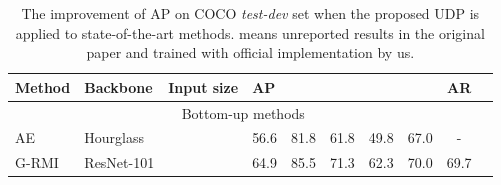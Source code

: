 \documentclass[10pt,journal,compsoc]{IEEEtran}
\begin{document}
\begin{table*}
\caption{The improvement of AP on COCO \textit{test-dev} set when the proposed UDP is applied to state-of-the-art methods.  means unreported results in the original paper and trained with official implementation by us.}
\label{tab:test-dev}
\begin{center}
\begin{tabular}{l|l|c|lcccccc}

\hline
Method                             & Backbone         &Input size  &AP   &  &  &  & &AR  \\
\hline
\multicolumn{9}{c}{Bottom-up methods}\\
\hline

AE \cite{AssociativeEmbedding}     & Hourglass\cite{Hourglass}   &    &56.6                  & 81.8              & 61.8         & 49.8          &67.0           &-   \\
G-RMI\cite{G-RMI}                  & ResNet-101     &  &64.9                  & 85.5              & 71.3         & 62.3          &70.0           &69.7\\


\end{tabular}
\end{center}
\end{table*}
\end{document}
